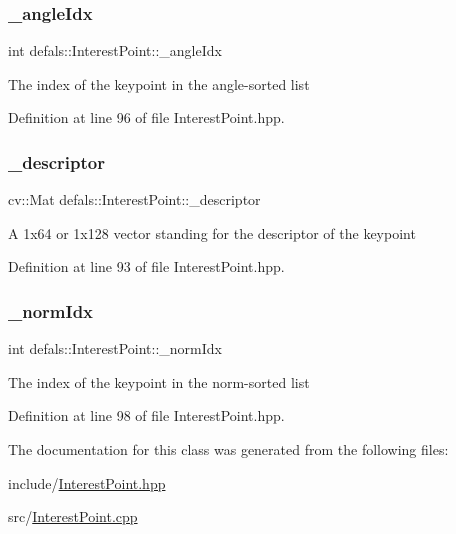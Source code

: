 \subsubsection{\texorpdfstring{\+\_\+angle\+Idx}{\_angleIdx}}
{\footnotesize\ttfamily int defals\+::\+Interest\+Point\+::\+\_\+angle\+Idx\hspace{0.3cm}{\ttfamily [private]}}

The index of the keypoint in the angle-\/sorted list 

Definition at line 96 of file Interest\+Point.\+hpp.

\mbox{\label{classdefals_1_1_interest_point_aaa341f5d37a05dcf8f53124a07274497}} 
\subsubsection{\texorpdfstring{\+\_\+descriptor}{\_descriptor}}
{\footnotesize\ttfamily cv\+::\+Mat defals\+::\+Interest\+Point\+::\+\_\+descriptor\hspace{0.3cm}{\ttfamily [private]}}

A 1x64 or 1x128 vector standing for the descriptor of the keypoint 

Definition at line 93 of file Interest\+Point.\+hpp.

\mbox{\label{classdefals_1_1_interest_point_a8e6671d9215b3a767479ec6e11bdb1d2}} 
\subsubsection{\texorpdfstring{\+\_\+norm\+Idx}{\_normIdx}}
{\footnotesize\ttfamily int defals\+::\+Interest\+Point\+::\+\_\+norm\+Idx\hspace{0.3cm}{\ttfamily [private]}}

The index of the keypoint in the norm-\/sorted list 

Definition at line 98 of file Interest\+Point.\+hpp.



The documentation for this class was generated from the following files\+:\begin{DoxyCompactItemize}
\item 
include/\hyperlink{_interest_point_8hpp}{Interest\+Point.\+hpp}\item 
src/\hyperlink{_interest_point_8cpp}{Interest\+Point.\+cpp}\end{DoxyCompactItemize}
